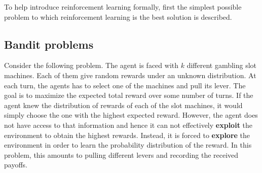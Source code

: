 To help introduce reinforcement learning formally,
first the simplest possible problem 
to which reinforcement learning is the best solution is described.

\subsection{Bandit problems}
Consider the following problem.
The agent is faced with $k$ different gambling slot machines.
Each of them give random rewards under an unknown distribution.
At each turn, the agents has to select one of the machines and pull its lever.
The goal is to maximize the expected total reward over some number of turns.
If the agent knew the distribution of rewards of each of the slot machines, 
it would simply choose the one with the highest expected reward.
However, the agent does not have access to that information
and hence it can not effectively \textbf{exploit} the environment to obtain the highest rewards.
Instead, it is forced to \textbf{explore} the environment in order to learn the probability distribution of the reward.
In this problem, this amounts to pulling different levers and recording the received payoffs.

